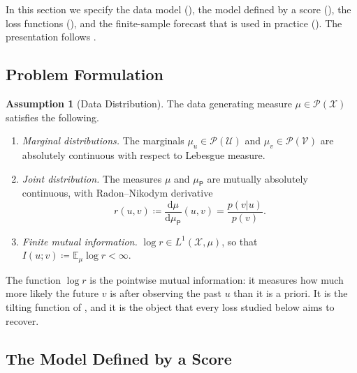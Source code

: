 \documentclass[11pt]{article}
\theoremstyle{plain}
\theoremstyle{definition}
\newtheorem{assumption}[theorem]{Assumption}
\theoremstyle{remark}
\newcommand{\E}{\mathbb{E}}
\newcommand{\Prob}{\mathcal{P}}
\newcommand{\UU}{\mathcal{U}}
\newcommand{\VV}{\mathcal{V}}
\newcommand{\XX}{\mathcal{X}}
\newcommand{\Dd}{\mathrm{d}}
\newcommand{\define}{\coloneqq}
\newcommand{\muP}{\mu_{\mathsf{P}}}
\begin{document}
In this section we specify the data model (), the model
defined by a score (), the loss functions
(), and the finite-sample forecast that is used in
practice (). The presentation follows
\cite{baptista2025mathematical,stuart2026expressivity}.

\subsection{Problem Formulation}
\label{ssec:problem}

\begin{assumption}[Data Distribution]
 \label{ass:data}
 The data generating measure $\mu\in\Prob(\XX)$ satisfies the following.
 \begin{enumerate}[start=1,label={(A\arabic*)}]
  \item \label{ass:marginals}\emph{Marginal distributions.}
        The marginals $\mu_u\in\Prob(\UU)$ and $\mu_v\in\Prob(\VV)$ are
        absolutely continuous with respect to Lebesgue measure.
  \item \label{ass:joint}\emph{Joint distribution.}
        The measures $\mu$ and $\muP$ are mutually absolutely continuous, with
        Radon--Nikodym derivative
        \begin{equation}
         r(u,v)\define\frac{\Dd\mu}{\Dd\muP}(u,v)
         =\frac{p(v\vert u)}{p(v)}.
         \label{eq:ratio}
        \end{equation}
  \item \label{ass:MI}\emph{Finite mutual information.}
        $\log r\in L^1(\XX,\mu)$, so that
        $I(u;v)\define\E_{\mu}\log r<\infty$.
 \end{enumerate}
\end{assumption}

The function $\log r$ is the pointwise mutual information: it measures how
much more likely the future $v$ is after observing the past $u$ than it is a
priori. It is the tilting function of \cite{stuart2026expressivity}, and it
is the object that every loss studied below aims to recover.

\subsection{The Model Defined by a Score}
\label{ssec:model}
\end{document}
